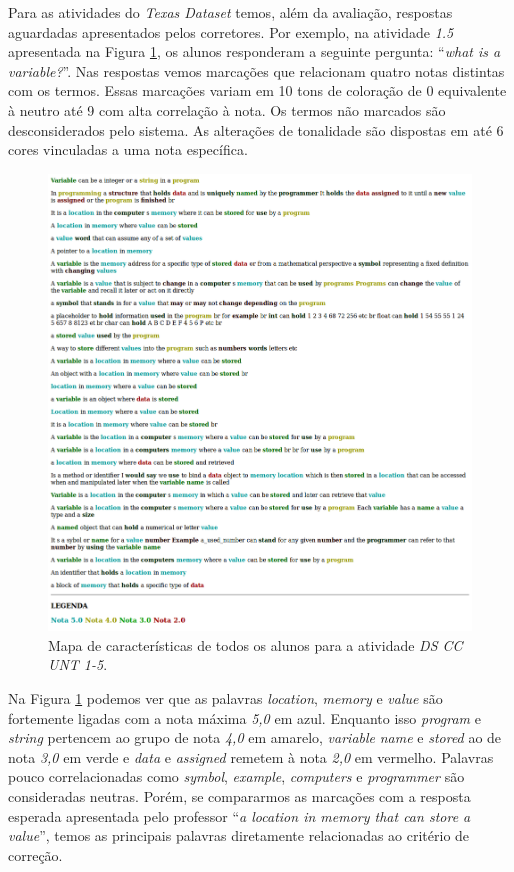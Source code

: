 Para as atividades do \textit{Texas Dataset} temos, além da avaliação, respostas aguardadas apresentados pelos corretores. Por exemplo, na atividade \textit{1.5} apresentada na Figura \ref{UNT-15}, os alunos responderam a seguinte pergunta: ``\textit{what is a variable?}''. Nas respostas vemos marcações que relacionam quatro notas distintas com os termos. Essas marcações variam em 10 tons de coloração de 0 equivalente à neutro até 9 com alta correlação à nota. Os termos não marcados são desconsiderados pelo sistema. As alterações de tonalidade são dispostas em até 6 cores vinculadas a uma nota específica.


\begin{figure}[h!]
\centering
\includegraphics[width=\textwidth]{img/UNT-1-5.png}
\caption{Mapa de características de todos os alunos para a atividade \textit{DS CC UNT 1-5}.}
\label{UNT-15}
\end{figure}

Na Figura \ref{UNT-15} podemos ver que as palavras \textit{location}, \textit{memory} e \textit{value} são fortemente ligadas com a nota máxima \textit{5,0} em azul. Enquanto isso \textit{program} e \textit{string} pertencem ao grupo de nota \textit{4,0} em amarelo, \textit{variable} \textit{name} e \textit{stored} ao de nota \textit{3,0} em verde e \textit{data} e \textit{assigned} remetem à nota \textit{2,0} em vermelho. Palavras pouco correlacionadas como \textit{symbol}, \textit{example}, \textit{computers} e \textit{programmer} são consideradas neutras. Porém, se compararmos as marcações com a resposta esperada apresentada pelo professor ``\textit{a location in memory that can store a value}'', temos as principais palavras diretamente relacionadas ao critério de correção.

